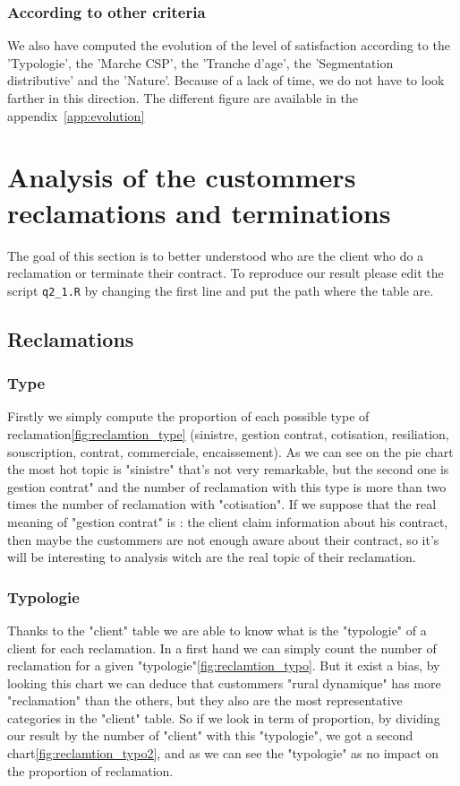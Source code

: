 \documentclass[a4paper, 11pt]{article}
\newcommand{\tw}[1]{\texttt{#1}}
\begin{document}
    \subsubsection{According to other criteria}
    We also have computed the evolution of the level of satisfaction according to the 'Typologie', the 'Marche CSP', the 'Tranche d'age', the 'Segmentation distributive' and the 'Nature'. Because of a lack of time, we do not have to look farther in this direction. The different figure are available in the appendix~\ref{app:evolution}
    
\section{Analysis of the custommers reclamations and terminations}
\label{sec:recl_anal}
	The goal of this section is to better understood who are the client who do a reclamation or terminate their contract. To reproduce our result please edit the script \tw{q2\_1.R} by changing the first line and put the path where the table are. 
    \subsection{Reclamations}
    
    	\subsubsection{Type}
    		Firstly we simply compute the proportion of each possible type of reclamation\ref{fig:reclamtion_type} (sinistre, gestion contrat, cotisation, resiliation, souscription, contrat, commerciale, encaissement). As we can see on the pie chart the most hot topic is "sinistre" that's not very remarkable, but the second one is gestion contrat" and the number of reclamation with this type is more than two times the number of reclamation with "cotisation". If we suppose that the real meaning of "gestion contrat" is : the client claim information about his contract, then maybe the custommers are not enough aware about their contract, so it's will be interesting to analysis witch are the real topic of their reclamation. 
            
       \subsubsection{Typologie}
       		Thanks to the "client" table we are able to know what is the "typologie" of a client for each reclamation. In a first hand we can simply count the number of reclamation for a given "typologie"\ref{fig:reclamtion_typo}. But it exist a bias, by looking this chart we can deduce that custommers "rural dynamique" has more "reclamation" than the others, but they also are the most representative categories in the "client" table. So if we look in term of proportion, by dividing our result by the number of "client" with this "typologie", we got a second chart\ref{fig:reclamtion_typo2}, and as we can see the "typologie" as no impact on the proportion of reclamation.
            
\end{document}
